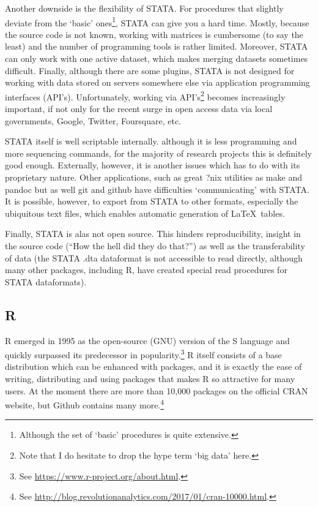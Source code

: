 \documentclass[fleqn,10pt]{SelfArx} %
\begin{document}
Another downside is the flexibility of STATA. For procedures that slightly deviate from the `basic' ones\footnote{Although the set of `basic' procedures is quite extensive.}, STATA can give you a hard time. Mostly, because the source code is not known, working with matrices is cumbersome (to say the least) and the number of programming tools is rather limited. Moreover, STATA can only work with one active dataset, which makes merging datasets sometimes difficult. Finally, although there are some plugins, STATA is not designed for working with data stored on servers somewhere else via application programming interfaces (API's). Unfortunately, working via API's\footnote{Note that I do hesitate to drop the hype term `big data' here.} becomes increasingly important, if not only for the recent surge in open access data via local governments, Google, Twitter, Foursquare, etc.

STATA itself is well scriptable internally. although it is less programming and more sequencing commands, for the majority of research projects this is definitely good enough. Externally, however, it is another issues which has to do with its proprietary nature. Other applications, such as great ?nix utilities as make and pandoc but as well git and github have difficulties `communicating' with STATA. It is possible, however, to export from STATA to other formats, especially the ubiquitous text files, which enables automatic generation of \LaTeX\ tables.

Finally, STATA is alas not open source. This hinders reproducibility, insight in the source code (``How the hell did they do that?'') as well as the transferability of data (the STATA .dta dataformat is not accessible to read directly, although many other packages, including R, have created special read procedures for STATA dataformats).

\subsection*{R}

R emerged in 1995 as the open-source (GNU) version of the S language and quickly surpassed its predecessor in popularity.\footnote{See \href{https://www.r-project.org/about.html}{https://www.r-project.org/about.html}.} R itself consists of a base distribution which can be enhanced with packages, and it is exactly the ease of writing, distributing and using packages that makes R so attractive for many users. At the moment there are more than 10,000 packages on the official CRAN website, but Github contains many more.\footnote{See \href{http://blog.revolutionanalytics.com/2017/01/cran-10000.html}{http://blog.revolutionanalytics.com/2017/01/cran-10000.html}.}
\end{document}
